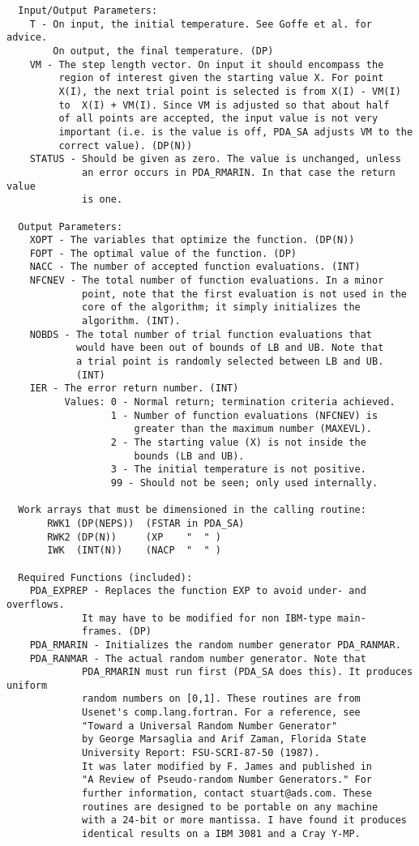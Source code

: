 \begin{verbatim}
  Input/Output Parameters:
    T - On input, the initial temperature. See Goffe et al. for advice.
        On output, the final temperature. (DP)
    VM - The step length vector. On input it should encompass the
         region of interest given the starting value X. For point
         X(I), the next trial point is selected is from X(I) - VM(I)
         to  X(I) + VM(I). Since VM is adjusted so that about half
         of all points are accepted, the input value is not very
         important (i.e. is the value is off, PDA_SA adjusts VM to the
         correct value). (DP(N))
    STATUS - Should be given as zero. The value is unchanged, unless
             an error occurs in PDA_RMARIN. In that case the return value
             is one.

  Output Parameters:
    XOPT - The variables that optimize the function. (DP(N))
    FOPT - The optimal value of the function. (DP)
    NACC - The number of accepted function evaluations. (INT)
    NFCNEV - The total number of function evaluations. In a minor
             point, note that the first evaluation is not used in the
             core of the algorithm; it simply initializes the
             algorithm. (INT).
    NOBDS - The total number of trial function evaluations that
            would have been out of bounds of LB and UB. Note that
            a trial point is randomly selected between LB and UB.
            (INT)
    IER - The error return number. (INT)
          Values: 0 - Normal return; termination criteria achieved.
                  1 - Number of function evaluations (NFCNEV) is
                      greater than the maximum number (MAXEVL).
                  2 - The starting value (X) is not inside the
                      bounds (LB and UB).
                  3 - The initial temperature is not positive.
                  99 - Should not be seen; only used internally.

  Work arrays that must be dimensioned in the calling routine:
       RWK1 (DP(NEPS))  (FSTAR in PDA_SA)
       RWK2 (DP(N))     (XP    "  " )
       IWK  (INT(N))    (NACP  "  " )

  Required Functions (included):
    PDA_EXPREP - Replaces the function EXP to avoid under- and overflows.
             It may have to be modified for non IBM-type main-
             frames. (DP)
    PDA_RMARIN - Initializes the random number generator PDA_RANMAR.
    PDA_RANMAR - The actual random number generator. Note that
             PDA_RMARIN must run first (PDA_SA does this). It produces uniform
             random numbers on [0,1]. These routines are from
             Usenet's comp.lang.fortran. For a reference, see
             "Toward a Universal Random Number Generator"
             by George Marsaglia and Arif Zaman, Florida State
             University Report: FSU-SCRI-87-50 (1987).
             It was later modified by F. James and published in
             "A Review of Pseudo-random Number Generators." For
             further information, contact stuart@ads.com. These
             routines are designed to be portable on any machine
             with a 24-bit or more mantissa. I have found it produces
             identical results on a IBM 3081 and a Cray Y-MP.


\end{verbatim}
